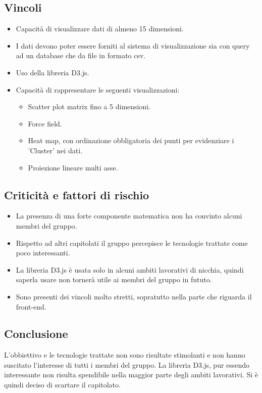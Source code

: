 \subsection{Vincoli}
\begin{itemize}
\item Capacità di visualizzare dati di almeno 15 dimensioni.
\item I dati devono poter essere forniti al sistema di visualizzazione sia con query ad un database che da file in formato csv.
\item Uso della libreria D3.js.
\item Capacità di rappresentare le seguenti visualizzazioni:
\begin{itemize}
	\item Scatter plot matrix fino a 5 dimensioni.
	\item Force field.
	\item Heat map, con ordinazione obbligatoria dei punti per evidenziare i 'Cluster' nei dati.
	\item Proiezione lineare multi asse.
\end{itemize}
\end{itemize}

\subsection{Criticità e fattori di rischio}
\begin{itemize}
\item La presenza di una forte componente matematica non ha convinto alcuni membri del gruppo.
\item Rispetto ad altri capitolati il gruppo percepisce le tecnologie trattate come poco interessanti.
\item La libreria D3.js è usata solo in alcuni ambiti lavorativi di nicchia, quindi saperla usare non tornerà utile ai membri del gruppo in fututo.
\item Sono presenti dei vincoli molto stretti, sopratutto nella parte che riguarda il front-end.
\end{itemize}

\subsection{Conclusione}
L'obbiettivo e le tecnologie trattate non sono risultate stimolanti e non hanno suscitato l'interesse di tutti i membri del gruppo. La libreria D3.js, pur essendo interessante non risulta spendibile nella maggior parte degli ambiti lavorativi. Si è quindi deciso di scartare il capitolato.